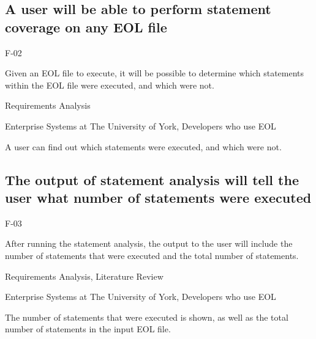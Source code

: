 \subsection{A user will be able to perform statement coverage on any EOL file}
\begin{description}[style=sameline,leftmargin=4.5cm,nolistsep]
\item[\hspace*{0.3cm}Label] F-02
\item[\hspace*{0.3cm}Description] Given an EOL file to execute, it will be possible to determine which statements within the EOL file were executed, and which were not.
\item[\hspace*{0.3cm}Source] Requirements Analysis
\item[\hspace*{0.3cm}Stakeholders] Enterprise Systems at The University of York, Developers who use EOL
\item[\hspace*{0.3cm}Satisfiable Conditions] A user can find out which statements were executed, and which were not.
\end{description}

\subsection{The output of statement analysis will tell the user what number of statements were executed}
\begin{description}[style=sameline,leftmargin=4.5cm,nolistsep]
\item[\hspace*{0.3cm}Label] F-03
\item[\hspace*{0.3cm}Description] After running the statement analysis, the output to the user will include the number of statements that were executed and the total number of statements.
\item[\hspace*{0.3cm}Source] Requirements Analysis, Literature Review
\item[\hspace*{0.3cm}Stakeholders] Enterprise Systems at The University of York, Developers who use EOL
\item[\hspace*{0.3cm}Satisfiable Conditions] The number of statements that were executed is shown, as well as the total number of statements in the input EOL file.
\end{description}

